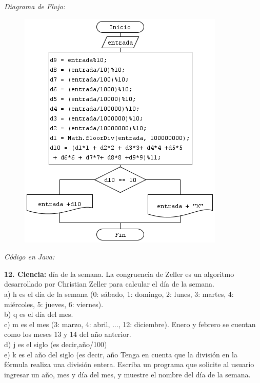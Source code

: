 \documentclass[12pt]{article}
\begin{document}
 
\textit{Diagrama de Flujo:  }
\begin{figure}[h!]
\centering
	\includegraphics[scale=1]{dicor/ISBN.png}    
\end{figure}
\newpage
\textit{Código en Java:}

\newpage


\textbf{12. Ciencia:} día de la semana. La congruencia de Zeller es un algoritmo desarrollado por
Christian Zeller para calcular el día de la semana.\\
a) h es el día de la semana (0: sábado, 1: domingo, 2: lunes, 3: martes, 4: miércoles, 5:
jueves, 6: viernes).\\
b) q es el día del mes.\\
c) m es el mes (3: marzo, 4: abril, ..., 12: diciembre). Enero y febrero se cuentan como
los meses 13 y 14 del año anterior. \\
d) j es el siglo (es decir,año/100)\\
e) k es el año del siglo (es decir, año %
Tenga en cuenta que la división en la fórmula realiza una división entera. Escriba un
programa que solicite al usuario ingresar un año, mes y día del mes, y muestre el nombre
del día de la semana.
\end{document}
